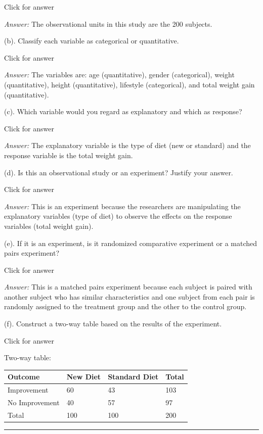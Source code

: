 \documentclass[
]{book}
\begin{document}
Click for answer

\emph{Answer:} The observational units in this study are the 200 subjects.

(b). Classify each variable as categorical or quantitative.

Click for answer

\emph{Answer:} The variables are: age (quantitative), gender (categorical), weight (quantitative), height (quantitative), lifestyle (categorical), and total weight gain (quantitative).

(c). Which variable would you regard as explanatory and which as response?

Click for answer

\emph{Answer:} The explanatory variable is the type of diet (new or standard) and the response variable is the total weight gain.

(d). Is this an observational study or an experiment? Justify your answer.

Click for answer

\emph{Answer:} This is an experiment because the researchers are manipulating the explanatory variables (type of diet) to observe the effects on the response variables (total weight gain).

(e). If it is an experiment, is it randomized comparative experiment or a matched pairs experiment?

Click for answer

\emph{Answer:} This is a matched pairs experiment because each subject is paired with another subject who has similar characteristics and one subject from each pair is randomly assigned to the treatment group and the other to the control group.

(f). Construct a two-way table based on the results of the experiment.

Click for answer

Two-way table:

\begin{longtable}[]{@{}llll@{}}
\toprule()
Outcome & New Diet & Standard Diet & Total \\
\midrule()
\endhead
Improvement & 60 & 43 & 103 \\
No Improvement & 40 & 57 & 97 \\
Total & 100 & 100 & 200 \\
\bottomrule()
\end{longtable}

\begin{center}\rule{0.5\linewidth}{0.5pt}\end{center}
\end{document}
